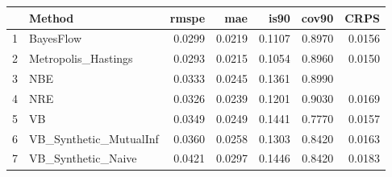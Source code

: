 \documentclass[12pt]{article}
\begin{document}
\thispagestyle{empty}
\begin{table}[ht]
\centering
\begin{tabular}{rlrrrrr}
  \hline
 & Method & rmspe & mae & is90 & cov90 & CRPS \\ 
  \hline
1 & BayesFlow & 0.0299 & 0.0219 & 0.1107 & 0.8970 & 0.0156 \\ 
  2 & Metropolis\_Hastings & 0.0293 & 0.0215 & 0.1054 & 0.8960 & 0.0150 \\ 
  3 & NBE & 0.0333 & 0.0245 & 0.1361 & 0.8990 &  \\ 
  4 & NRE & 0.0326 & 0.0239 & 0.1201 & 0.9030 & 0.0169 \\ 
  5 & VB & 0.0349 & 0.0249 & 0.1441 & 0.7770 & 0.0157 \\ 
  6 & VB\_Synthetic\_MutualInf & 0.0360 & 0.0258 & 0.1303 & 0.8420 & 0.0163 \\ 
  7 & VB\_Synthetic\_Naive & 0.0421 & 0.0297 & 0.1446 & 0.8420 & 0.0183 \\ 
   \hline
\end{tabular}
\end{table}
\end{document}
